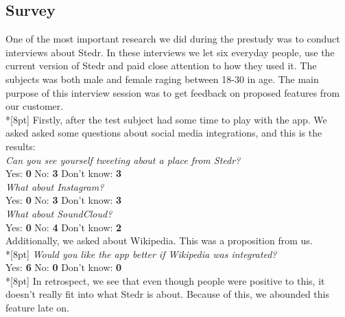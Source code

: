 		
	\subsection{Survey}


	One of the most important research we did during the prestudy was to conduct interviews about Stedr. In these interviews we let six everyday people, use the current version of Stedr and paid close attention to how they used it. The subjects was both male and female raging between 18-30 in age. The main purpose of this interview session was to get feedback on proposed features from our customer.\\*[8pt]
	Firstly, after the test subject had some time to play with the app. We asked asked some questions about social media integrations, and this is the results:\\

	\emph{Can you see yourself tweeting about a place from Stedr?}\\
	Yes: \textbf{0}\hspace{0.5cm}
	No: \textbf{3}\hspace{0.5cm}
	Don't know: \textbf{3}\\[6pt]
	
	\emph{What about Instagram?}\\
	Yes: \textbf{0}\hspace{0.5cm}
	No: \textbf{3}\hspace{0.5cm}
	Don't know: \textbf{3}\\[6pt]
	
	\emph{What about SoundCloud?}\\
	Yes: \textbf{0}\hspace{0.5cm}
	No: \textbf{4}\hspace{0.5cm}
	Don't know: \textbf{2}\hspace{0.5cm}\\[6pt]

	Additionally, we asked about Wikipedia. This was a proposition from us.\\*[8pt]
	\emph{Would you like the app better if Wikipedia was integrated?}\\
	Yes: \textbf{6}\hspace{0.5cm}
	No: \textbf{0}\hspace{0.5cm}
	Don't know:  \textbf{0}\\*[8pt]
	In retrospect, we see that even though people were positive to this, it doesn't really fit into what Stedr is about. Because of this, we abounded this feature late on.\\
	
